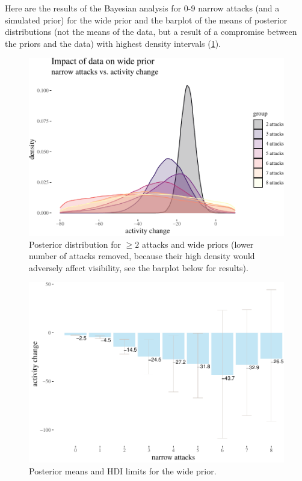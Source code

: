 \documentclass[
  10pt,
  dvipsnames]{scrartcl}
\begin{document}
\normalsize

\footnotesize

\normalsize

Here are the results of the Bayesian analysis for 0-9 narrow attacks
(and a simulated prior) for the wide prior and the barplot of the means
of posterior distributions (not the means of the data, but a result of a
compromise between the priors and the data) with highest density
intervals (\ref{fig:bayesian1}).

\begin{figure}[H]

\begin{center}\includegraphics[width=1\linewidth]{testPatrycja_files/figure-latex/unnamed-chunk-25-1} \end{center}
\caption{Posterior distribution for $\geq 2$ attacks and wide priors (lower number of attacks removed, because their high density would adversely affect visibility, see the barplot below for results).}
\label{fig:bayesian1}

\end{figure}

\begin{figure}[H]

\begin{center}\includegraphics[width=1\linewidth]{testPatrycja_files/figure-latex/unnamed-chunk-26-1} \end{center}
\caption{Posterior means and HDI limits for the wide prior.}
\end{figure}
\end{document}
